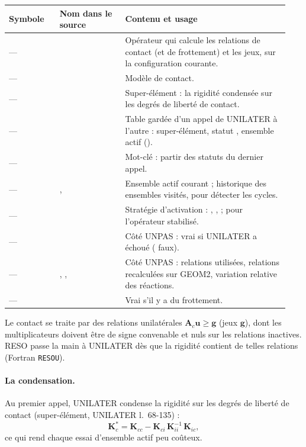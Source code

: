 \documentclass[11pt,a4paper]{article}
\makeatletter
\numberwithin{equation}{section}
\newcommand{\src}[1]{\texttt{\detokenize{#1}}}          %
\newcommand{\pr}[1]{\textsf{#1}}                        %
\newcommand{\op}[1]{\textsf{\small #1}}                 %
\newcommand{\lig}[1]{l.~#1}
\newcommand{\vc}[1]{\symbf{#1}}                         %
\newenvironment{glossaire}[1][Glossaire]{%
  \par\smallskip\needspace{7\baselineskip}\noindent{\sffamily\bfseries\small #1}\par\nopagebreak
  \small
  \renewcommand{\arraystretch}{1.18}
  \begin{longtable}{@{}>{\raggedright\arraybackslash}p{0.17\linewidth}
                     >{\raggedright\arraybackslash}p{0.22\linewidth}
                     >{\raggedright\arraybackslash}p{0.555\linewidth}@{}}
  \toprule
  \textbf{Symbole} & \textbf{Nom dans le source} & \textbf{Contenu et usage}\\
  \midrule\endhead
  \bottomrule\endfoot}
  {\end{longtable}\addtocounter{table}{-1}\normalsize\vspace{-0.4em}}
\makeatother
\begin{document}
\begin{glossaire}
— & \src{RFCO} & Opérateur qui calcule les relations de contact (et de frottement) et les jeux, sur la configuration courante.\\
— & \src{MODCONTA} & Modèle de contact.\\
— & \src{SUP} & Super-élément : la rigidité condensée sur les degrés de liberté de contact.\\
— & \src{MATAB} & Table gardée d'un appel de \pr{UNILATER} à l'autre : super-élément, statut \src{'OK'}, ensemble actif (\src{MATAB.6}).\\
— & \src{INIB} & Mot-clé : partir des statuts du dernier appel.\\
— & \src{LISEN}, \src{LITOT} & Ensemble actif courant ; historique des ensembles visités, pour détecter les cycles.\\
— & \src{OPTION} & Stratégie d'activation : \src{RAPIDE}, \src{MOYEN}, \src{LENT} ; \src{MOSTAB} \src{'STAB'} pour l'opérateur stabilisé.\\
— & \src{PASUNIL} & Côté \pr{UNPAS} : vrai si \pr{UNILATER} a échoué (\src{'OK'} faux).\\
— & \src{CRR}, \src{CRRN}, \src{RAP4} & Côté \pr{UNPAS} : relations utilisées, relations recalculées sur GEOM2, variation relative des réactions.\\
— & \src{CAFROTTE} & Vrai s'il y a du frottement.\\
\end{glossaire}

Le contact se traite par des relations unilatérales $\vc A_c\vc u \ge \vc g$ (jeux $\vc g$), dont les multiplicateurs doivent être de signe convenable et nuls sur les relations inactives.
\op{RESO} passe la main à \pr{UNILATER} dès que la rigidité contient de telles relations (Fortran \texttt{RESOU}).

\paragraph{La condensation.}
Au premier appel, \pr{UNILATER} condense la rigidité sur les degrés de liberté de contact (super-élément, \pr{UNILATER} \lig{68-135}) :
\begin{equation}
\vc K_c^{*} = \vc K_{cc} - \vc K_{ci}\,\vc K_{ii}^{-1}\,\vc K_{ic},
\end{equation}
ce qui rend chaque essai d'ensemble actif peu coûteux.
\end{document}
